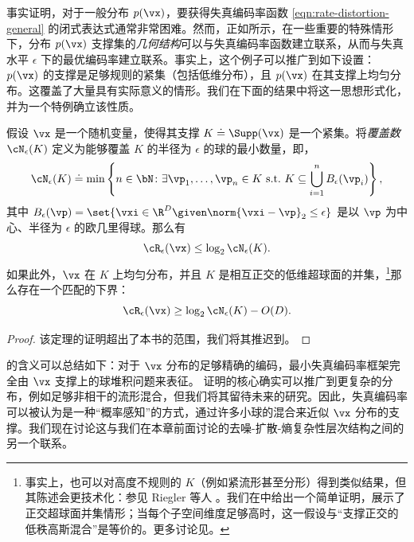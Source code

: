 \documentclass[../../book-main_zh.tex]{subfiles}
\begin{document}
事实证明，对于一般分布 $p(\vx)$，要获得失真编码率函数 \eqref{eqn:rate-distortion-general} 的闭式表达式通常非常困难。然而，正如所示，在一些重要的特殊情形下，分布 $p(\vx)$ 支撑集的\textit{几何结构}可以与失真编码率函数建立联系，从而与失真水平 $\epsilon$ 下的最优编码率建立联系。事实上，这个例子可以推广到如下设置：$p(\vx)$ 的支撑是足够规则的紧集（包括低维分布），且 $p(\vx)$ 在其支撑上均匀分布。这覆盖了大量具有实际意义的情形。我们在下面的结果中将这一思想形式化，并为一个特例确立该性质。

\begin{theorem}\label{thm:covering-number-rate-distortion}
    假设 \(\vx\) 是一个随机变量，使得其支撑 \(K \doteq \Supp(\vx)\) 是一个紧集。将\textit{覆盖数} \(\cN_{\epsilon}(K)\) 定义为能够覆盖 \(K\) 的半径为 \(\epsilon\) 的球的最小数量，即，
    \begin{equation}
        \cN_{\epsilon}(K) \doteq \min\left\{n \in \bN \colon \exists
            \vp_{1}, \dots, \vp_{n} \in K\ \text{s.t.}\ K \subseteq
        \bigcup_{i = 1}^{n}B_{\epsilon}(\vp_{i})\right\},
    \end{equation}
    其中 \(B_{\epsilon}(\vp) = \set{\vxi\in \R^D \given \norm{\vxi -
            \vp}_2 \leq
    \epsilon}\) 是以 \(\vp\) 为中心、半径为 \(\epsilon\) 的欧几里得球。那么有
    \begin{equation}
        \cR_{\epsilon}(\vx)
        \leq \log_{2} \cN_{\epsilon}(K).
    \end{equation}
    如果此外，$\vx$ 在 $K$ 上均匀分布，并且 $K$ 是相互正交的低维超球面的并集，\footnote{事实上，也可以对高度不规则的 $K$（例如紧流形甚至分形）得到类似结果，但其陈述会更技术化：参见 Riegler 等人 \cite{Riegler2018-jh,Riegler2023-rr}。我们在中给出一个简单证明，展示了正交超球面并集情形；当每个子空间维度足够高时，这一假设与“支撑正交的低秩高斯混合”是等价的。更多讨论见。}那么存在一个匹配的下界：
    \begin{equation}
        \cR_{\epsilon}(\vx)
        \geq
        \log_{2} \cN_{\epsilon}(K) - O(D).
    \end{equation}
\end{theorem}
\begin{proof}
    该定理的证明超出了本书的范围，我们将其推迟到。
\end{proof}

 的含义可以总结如下：对于 $\vx$ 分布的足够精确的编码，最小失真编码率框架完全由 $\vx$ 支撑上的球堆积问题来表征。 证明的核心确实可以推广到更复杂的分布，例如足够非相干的流形混合，但我们将其留待未来的研究。因此，失真编码率可以被认为是一种“概率感知”的方式，通过许多小球的混合来近似 \(\vx\) 分布的支撑。我们现在讨论这与我们在本章前面讨论的去噪-扩散-熵复杂性层次结构之间的另一个联系。
\end{document}
